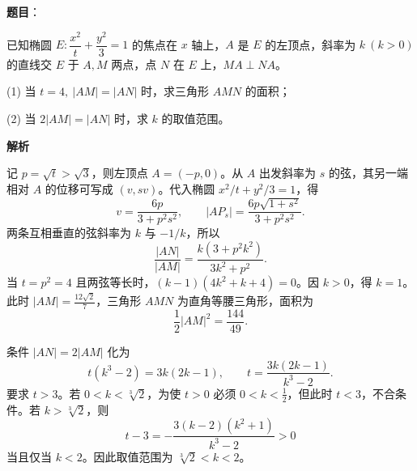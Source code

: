 \begin{answer}

\textbf{题目}：

已知椭圆 \(E:\dfrac{x^2}{t}+\dfrac{y^2}{3}=1\) 的焦点在 \(x\) 轴上，\(A\) 是 \(E\) 的左顶点，斜率为 \(k\ (k>0)\) 的直线交 \(E\) 于 \(A,M\) 两点，点 \(N\) 在 \(E\) 上，\(MA\perp NA\)。

   (1) 当 \(t=4,\ |AM|=|AN|\) 时，求三角形 \(AMN\) 的面积；

   (2) 当 \(2|AM|=|AN|\) 时，求 \(k\) 的取值范围。

\textbf{解析}


记 \(p=\sqrt t>\sqrt3\)，则左顶点 \(A=(-p,0)\)。从 \(A\) 出发斜率为 \(s\) 的弦，其另一端相对 \(A\) 的位移可写成 \((v,sv)\)。代入椭圆 \(x^2/t+y^2/3=1\)，得
\nopagebreak[4]
\[
v=\frac{6p}{3+p^2s^2},\qquad |A P_s|=\frac{6p\sqrt{1+s^2}}{3+p^2s^2}.
\]
两条互相垂直的弦斜率为 \(k\) 与 \(-1/k\)，所以
\nopagebreak[4]
\[
\frac{|AN|}{|AM|}=\frac{k(3+p^2k^2)}{3k^2+p^2}.
\]
当 \(t=p^2=4\) 且两弦等长时，\((k-1)(4k^2+k+4)=0\)。因 \(k>0\)，得 \(k=1\)。此时 \(|AM|=\frac{12\sqrt2}{7}\)，三角形 \(AMN\) 为直角等腰三角形，面积为
\nopagebreak[4]
\[
\frac12|AM|^2=\frac{144}{49}.
\]


条件 \(|AN|=2|AM|\) 化为
\nopagebreak[4]
\[
t(k^3-2)=3k(2k-1),\qquad t=\frac{3k(2k-1)}{k^3-2}.
\]
要求 \(t>3\)。若 \(0<k<\sqrt[3]2\)，为使 \(t>0\) 必须 \(0<k<\frac12\)，但此时 \(t<3\)，不合条件。若 \(k>\sqrt[3]2\)，则
\nopagebreak[4]
\[
t-3=-\frac{3(k-2)(k^2+1)}{k^3-2}>0
\]
当且仅当 \(k<2\)。因此取值范围为 \(\sqrt[3]2<k<2\)。



\end{answer}
